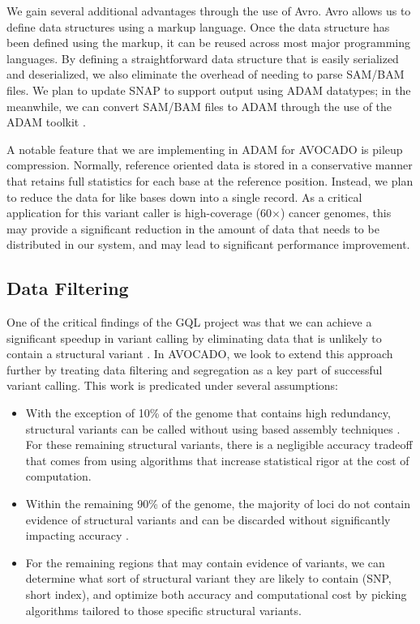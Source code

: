 \documentclass[11pt]{article}
\begin{document}
We gain several additional advantages through the use of Avro. Avro allows us to define data structures using a markup
language. Once the data structure has been defined using the markup, it can be reused across most major programming
languages. By defining a straightforward data structure that is easily serialized and deserialized, we also eliminate the overhead
of needing to parse SAM/BAM files. We plan to update SNAP to support output using ADAM datatypes; in the meanwhile,
we can convert SAM/BAM files to ADAM through the use of the ADAM toolkit \cite{adam}.

A notable feature that we are implementing in ADAM for AVOCADO is pileup compression. Normally, reference oriented data is
stored in a conservative manner that retains full statistics for each base at the reference position. Instead, we plan to reduce the
data for like bases down into a single record. As a critical application for this variant caller is high-coverage (60$\times$) cancer
genomes, this may provide a significant reduction in the amount of data that needs to be distributed in our system, and may lead
to significant performance improvement.

\subsection{Data Filtering}
\label{sec:data-filtering}

One of the critical findings of the GQL project was that we can achieve a significant speedup in variant calling by eliminating
data that is unlikely to contain a structural variant \cite{kozanitis13}. In AVOCADO, we look to extend this approach further by treating
data filtering and segregation as a key part of successful variant calling. This work is predicated under several assumptions:

\begin{itemize}
\item With the exception of 10\% of the genome that contains high redundancy, structural variants can be called without
using based assembly techniques \cite{xia09}. For these remaining structural variants, there is a negligible accuracy
tradeoff that comes from using algorithms that increase statistical rigor at the cost of computation.
\item Within the remaining 90\% of the genome, the majority of loci do not contain evidence of structural variants and
can be discarded without significantly impacting accuracy \cite{kozanitis13}.
\item For the remaining regions that may contain evidence of variants, we can determine what sort of structural variant they
are likely to contain (SNP, short index), and optimize both accuracy and computational cost by picking algorithms tailored
to those specific structural variants.
\end{itemize}
\end{document}
